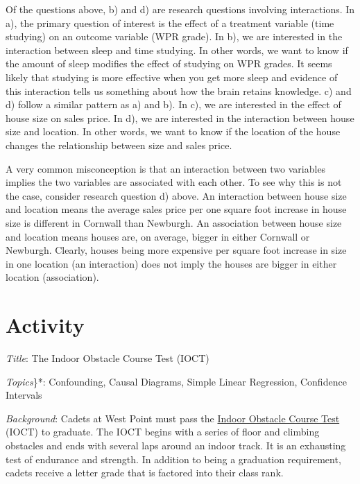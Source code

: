 \documentclass[]{book}
\begin{document}
Of the questions above, b) and d) are research questions involving interactions. In a), the primary question of interest is the effect of a treatment variable (time studying) on an outcome variable (WPR grade). In b), we are interested in the interaction between sleep and time studying. In other words, we want to know if the amount of sleep modifies the effect of studying on WPR grades. It seems likely that studying is more effective when you get more sleep and evidence of this interaction tells us something about how the brain retains knowledge. c) and d) follow a similar pattern as a) and b). In c), we are interested in the effect of house size on sales price. In d), we are interested in the interaction between house size and location. In other words, we want to know if the location of the house changes the relationship between size and sales price.

A very common misconception is that an interaction between two variables implies the two variables are associated with each other. To see why this is not the case, consider research question d) above. An interaction between house size and location means the average sales price per one square foot increase in house size is different in Cornwall than Newburgh. An association between house size and location means houses are, on average, bigger in either Cornwall or Newburgh. Clearly, houses being more expensive per square foot increase in size in one location (an interaction) does not imply the houses are bigger in either location (association).

\hypertarget{activity}{%
\chapter{Activity}\label{activity}}

\emph{Title}: The Indoor Obstacle Course Test (IOCT)

\emph{Topics}\}*: Confounding, Causal Diagrams, Simple Linear Regression, Confidence Intervals

\emph{Background}: Cadets at West Point must pass the \href{https://www.youtube.com/watch?v=94tPO0fGtJo\&t=77s}{Indoor Obstacle Course Test} (IOCT) to graduate. The IOCT begins with a series of floor and climbing obstacles and ends with several laps around an indoor track. It is an exhausting test of endurance and strength. In addition to being a graduation requirement, cadets receive a letter grade that is factored into their class rank.
\end{document}
